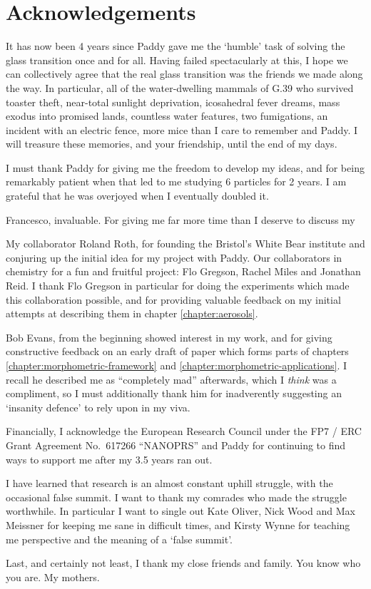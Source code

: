 
\chapter*{Acknowledgements}

It has now been 4 years since Paddy gave me the `humble' task of solving the glass transition once and for all.
Having failed spectacularly at this, I hope we can collectively agree that the real glass transition was the friends we made along the way.
In particular, all of the water-dwelling mammals of G.39 who survived toaster theft, near-total sunlight deprivation, icosahedral fever dreams, mass exodus into promised lands, countless water features, two fumigations, an incident with an electric fence, more mice than I care to remember and Paddy.
I will treasure these memories, and your friendship, until the end of my days.

I must thank Paddy for giving me the freedom to develop my ideas, and for being remarkably patient when that led to me studying 6 particles for 2 years.
I am grateful that he was overjoyed when I eventually doubled it.

Francesco, invaluable.
For giving me far more time than I deserve to discuss my 

My collaborator Roland Roth, for founding the Bristol's White Bear institute and conjuring up the initial idea for my project with Paddy.
Our collaborators in chemistry for a fun and fruitful project: Flo Gregson, Rachel Miles and Jonathan Reid.
I thank Flo Gregson in particular for doing the experiments which made this collaboration possible, and for providing valuable feedback on my initial attempts at describing them in chapter \ref{chapter:aerosols}.

Bob Evans, from the beginning showed interest in my work, and for giving constructive feedback on an early draft of paper which forms parts of chapters \ref{chapter:morphometric-framework} and \ref{chapter:morphometric-applications}.
I recall he described me as ``completely mad'' afterwards, which I \emph{think} was a compliment, so I must additionally thank him for inadverently suggesting an `insanity defence' to rely upon in my viva.

Financially, I acknowledge the European Research Council under the FP7 / ERC Grant Agreement No.\ 617266 ``NANOPRS'' and Paddy for continuing to find ways to support me after my 3.5 years ran out.

I have learned that research is an almost constant uphill struggle, with the occasional false summit.
I want to thank my comrades who made the struggle worthwhile.
In particular I want to single out Kate Oliver, Nick Wood and Max Meissner for keeping me sane in difficult times, and Kirsty Wynne for teaching me perspective and the meaning of a `false summit'.

Last, and certainly not least, I thank my close friends and family.
You know who you are.
My mothers.


